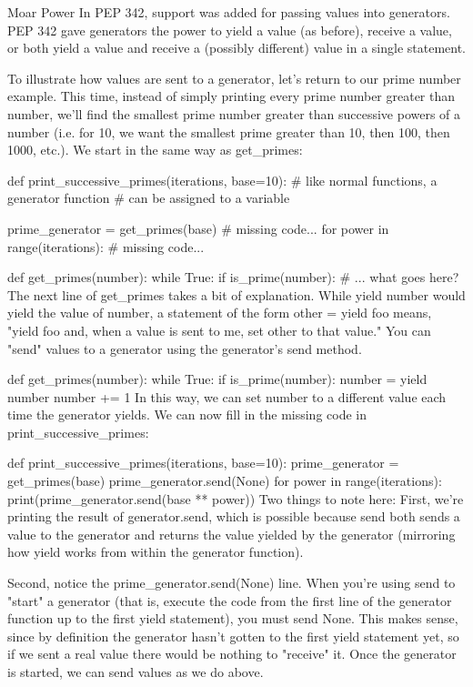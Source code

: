 Moar Power
In PEP 342, support was added for passing values into generators. PEP 342 gave generators the power to yield a value (as before), receive a value, or both yield a value and receive a (possibly different) value in a single statement.

To illustrate how values are sent to a generator, let's return to our prime number example. This time, instead of simply printing every prime number greater than number, we'll find the smallest prime number greater than successive powers of a number (i.e. for 10, we want the smallest prime greater than 10, then 100, then 1000, etc.). We start in the same way as get_primes:

def print_successive_primes(iterations, base=10):
    # like normal functions, a generator function
    # can be assigned to a variable

    prime_generator = get_primes(base)
    # missing code...
    for power in range(iterations):
        # missing code...

def get_primes(number):
    while True:
        if is_prime(number):
        # ... what goes here?
The next line of get_primes takes a bit of explanation. While yield number would yield the value of number, a statement of the form other = yield foo means, "yield foo and, when a value is sent to me, set other to that value." You can "send" values to a generator using the generator's send method.

def get_primes(number):
    while True:
        if is_prime(number):
            number = yield number
        number += 1
In this way, we can set number to a different value each time the generator yields. We can now fill in the missing code in print_successive_primes:

def print_successive_primes(iterations, base=10):
    prime_generator = get_primes(base)
    prime_generator.send(None)
    for power in range(iterations):
        print(prime_generator.send(base ** power))
Two things to note here: First, we're printing the result of generator.send, which is possible because send both sends a value to the generator and returns the value yielded by the generator (mirroring how yield works from within the generator function).

Second, notice the prime_generator.send(None) line. When you're using send to "start" a generator (that is, execute the code from the first line of the generator function up to the first yield statement), you must send None. This makes sense, since by definition the generator hasn't gotten to the first yield statement yet, so if we sent a real value there would be nothing to "receive" it. Once the generator is started, we can send values as we do above.

